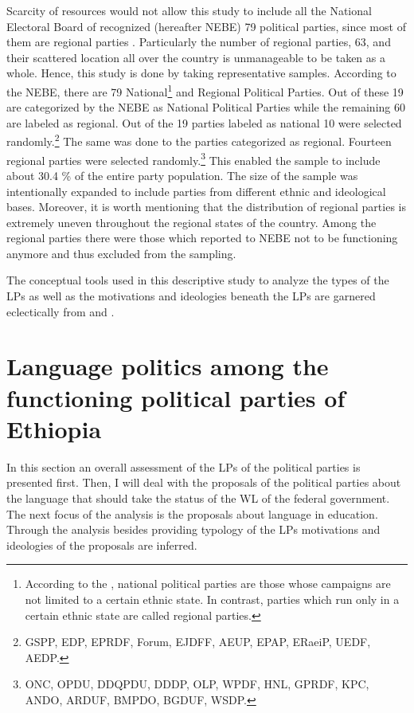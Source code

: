 \documentclass[output=paper,modfonts]{langscibook}
\begin{document}
Scarcity of resources would not allow this study to include all the National Electoral Board of  recognized (hereafter NEBE) 79 political parties, since most of them are regional parties \citep{NEBE2009}. Particularly the number of regional parties, 63, and their scattered location all over the country is unmanageable to be taken as a whole. Hence, this study is done by taking representative samples. According to the NEBE, there are 79 National\footnote{According to the \citet{NEBE2009}, national political parties are those whose campaigns are not limited to a certain ethnic state. In contrast, parties which run only in a certain ethnic state are called regional parties.} and Regional Political Parties. Out of these 19 are categorized by the NEBE as National Political Parties while the remaining 60 are labeled as regional. Out of the 19 parties labeled as national 10 were selected randomly.\footnote{GSPP, EDP, EPRDF, Forum, EJDFF, AEUP, EPAP, ERaeiP, UEDF, AEDP.} The same was done to the parties categorized as regional. Fourteen regional parties were selected randomly.\footnote{ONC, OPDU, DDQPDU, DDDP, OLP, WPDF, HNL, GPRDF, KPC, ANDO, ARDUF, BMPDO, BGDUF, WSDP.} This enabled the sample to include about 30.4 \% of the entire party population. The size of the sample was intentionally expanded to include parties from different ethnic and ideological bases. Moreover, it is worth mentioning that the distribution of regional parties is extremely uneven throughout the regional states of the country. Among the regional parties there were those which reported to NEBE not to be functioning anymore and thus excluded from the sampling. 

The conceptual tools used in this descriptive study to analyze the types of the LPs as well as the motivations and ideologies beneath the LPs are garnered eclectically from \citet{Fishman1972,Cobarrubias1983,Schiffman1996} and \citet{Patten2001}.
 
\section{Language politics among the functioning political parties of Ethiopia} 

In this section an overall assessment of the LPs of the political parties is presented first. Then, I will deal with the proposals of the political parties about the language that should take the status of the WL of the federal government. The next focus of the analysis is the proposals about language in education. Through the analysis besides providing typology of the LPs motivations and ideologies of the proposals are inferred.
 
\end{document}
